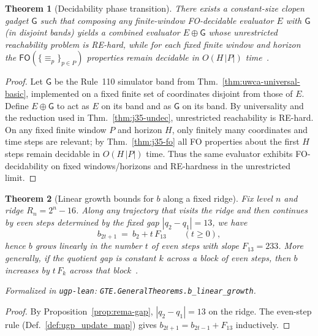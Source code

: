 \documentclass[12pt]{article}
\newtheorem{theorem}{Theorem}[section]
\numberwithin{equation}{section}
\begin{document}
\begin{theorem}[Decidability phase transition]\label{thm:phase-transition}
There exists a constant-size clopen gadget $\mathsf{G}$ such that composing any finite-window FO-decidable evaluator $E$ with $\mathsf{G}$ (in disjoint bands) yields a combined evaluator $E\oplus\mathsf{G}$ whose unrestricted reachability problem is RE-hard, while for each fixed finite window and horizon the $\mathsf{FO}(\{\equiv_p\}_{p\in P})$ properties remain decidable in $O(H\,|P|)$ time~\cite{SpivackUGPFormalization,ugp-lean}.
\end{theorem}

\begin{proof}
Let $\mathsf{G}$ be the Rule~110 simulator band from Thm.~\ref{thm:uwca-universal-basic}, implemented on a fixed finite set of coordinates disjoint from those of $E$. Define $E\oplus\mathsf{G}$ to act as $E$ on its band and as $\mathsf{G}$ on its band. By universality and the reduction used in Thm.~\ref{thm:j35-undec}, unrestricted reachability is RE-hard. On any fixed finite window $P$ and horizon $H$, only finitely many coordinates and time steps are relevant; by Thm.~\ref{thm:j35-fo} all FO properties about the first $H$ steps remain decidable in $O(H\,|P|)$ time. Thus the same evaluator exhibits FO-decidability on fixed windows/horizons and RE-hardness in the unrestricted limit.
\end{proof}


\begin{theorem}[Linear growth bounds for $b$ along a fixed ridge]\label{thm:j35-growth}
Fix level $n$ and ridge $R_n=2^n-16$. Along any trajectory that visits the ridge and then continues by even steps determined by the fixed gap $|q_2-q_1|=13$, we have
\[
b_{2t+1}\ =\ b_2 + t\,F_{13}\qquad (t\ge 0),
\]
hence $b$ grows linearly in the number $t$ of even steps with slope $F_{13}=233$. More generally, if the quotient gap is constant $k$ across a block of even steps, then $b$ increases by $t\,F_k$ across that block~\cite{SpivackUGPFormalization,ugp-lean}.

\noindent\emph{Formalized in} \texttt{ugp-lean}: \texttt{GTE.GeneralTheorems.b\_linear\_growth}.
\end{theorem}
\begin{proof}
By Proposition~\ref{prop:rema-gap}, $|q_2-q_1|=13$ on the ridge. The even-step rule (Def.~\ref{def:ugp_update_map}) gives $b_{2t+1}=b_{2t-1}+F_{13}$ inductively.
\end{proof}
\end{document}
